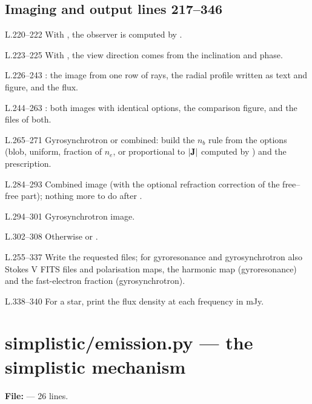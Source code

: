 \section*{\normalsize Imaging and output \hfill{\small\mdseries\color{gray}lines 217--346}}

\begin{lines}
\item[L.220–222] With , the observer is computed by .
\item[L.223–225] With , the view direction comes from the inclination and phase.
\item[L.226–243] : the image from one row of rays, the radial profile written as text and figure, and the flux.
\item[L.244–263] : both images with identical options, the comparison figure, and the files of both.
\item[L.265–271] Gyrosynchrotron or combined: build the $n_b$ rule from the options (blob, uniform, fraction of $n_e$, or proportional to $|\mathbf{J}|$ computed by ) and the  prescription.
\item[L.284–293] Combined image (with the optional refraction correction of the free--free part); nothing more to do after .
\item[L.294–301] Gyrosynchrotron image.
\item[L.302–308] Otherwise  or .
\item[L.255–337] Write the requested files; for gyroresonance and gyrosynchrotron also Stokes V FITS files and polarisation maps, the harmonic map (gyroresonance) and the fast-electron fraction (gyrosynchrotron).
\item[L.338–340] For a star, print the flux density at each frequency in mJy.
\end{lines}

\chapter{simplistic/emission.py --- the simplistic mechanism}
\label{mod:simplistic:emission.py}
\textbf{File:}  --- 26 lines.


